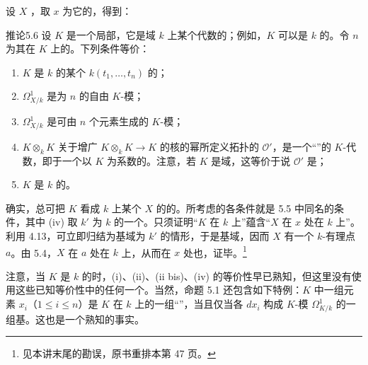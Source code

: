 设 $X$ ，取 $x$ 为它的，得到：
\begin{SGAresult}{推论}{5.6}
设 $K$ 是一个局部，它是域 $k$ 上某个代数的；例如，$K$ 可以是 $k$ 的。令 $n$ 为其在 $K$ 上的。下列条件等价：
\begin{enumerate}
\item[(i)] $K$ 是 $k$ 的某个 $k(t_1,\ldots,t_n)$ 的；
\item[(ii)] $\Omega^1_{X/k}$ 是为 $n$ 的自由 $K$-模；
\item[(ii bis)] $\Omega^1_{X/k}$ 是可由 $n$ 个元素生成的 $K$-模；
\item[(iii)] $K\otimes_k K$ 关于增广 $K\otimes_k K\to K$ 的核的幂所定义拓扑的 $\mathcal O'$，是一个“”的 $K$-代数，即于一个以 $K$ 为系数的。注意，若 $K$ 是域，这等价于说 $\mathcal O'$ 是；
\item[(iv)] $K$ 是 $k$ 的。
\end{enumerate}
\end{SGAresult}
确实，总可把 $K$ 看成 $k$ 上某个 $X$ 的的。所考虑的各条件就是 5.5 中同名的条件，其中 (iv) 取 $k'$ 为 $k$ 的一个。只须证明“$K$ 在 $k$ 上”蕴含“$X$ 在 $x$ 处在 $k$ 上”。利用 4.13，可立即归结为基域为 $k'$ 的情形，于是基域，因而 $X$ 有一个 $k$-有理点 $a$。由 5.4，$X$ 在 $a$ 处在 $k$ 上，从而在 $x$ 处也，证毕。\footnote{见本讲末尾的勘误，原书重排本第 47 页。}

注意，当 $K$ 是 $k$ 的时，(i)、(ii)、(ii bis)、(iv) 的等价性早已熟知，但这里没有使用这些已知等价性中的任何一个。当然，命题 5.1 还包含如下特例：$K$ 中一组元素 $x_i$（$1\leq i\leq n$）是 $K$ 在 $k$ 上的一组“”，当且仅当各 $dx_i$ 构成 $K$-模 $\Omega^1_{K/k}$ 的一组基。这也是一个熟知的事实。

